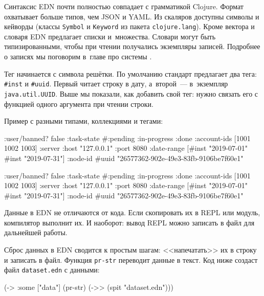 Синтаксис EDN почти полностью совпадает с грамматикой Clojure. Формат охватывает
больше типов, чем JSON и YAML. Из скаляров доступны символы и кейворды (классы
\verb|Symbol| и \verb|Keyword| из пакета \verb|clojure.lang|). Кроме вектора и
словаря EDN предлагает списки и~множества. Словари могут быть типизированными,
чтобы при чтении получались экземпляры записей. Подробнее о записях мы поговорим
в~главе про системы .


Тег начинается с символа решётки. По умолчанию стандарт предлагает два тега:
\verb|#inst| и \verb|#uuid|. Первый читает строку в дату, а~второй~---
в~экземпляр \verb|java.util.UUID|. Выше мы показали, как добавить свой тег:
нужно связать его с функцией одного аргумента при чтении строки.

Пример с разными типами, коллекциями и тегами:

\ifnarrow

\begin{english}
  \begin{clojure}
{:user/banned? false
 :task-state
 #{:pending :in-progress :done}
 :account-ids
 [1001 1002 1003]
 :server
 {:host "127.0.0.1" :port 8080}
 :date-range
 [#inst "2019-07-01" #inst "2019-07-31"]
 :node-id #uuid
 "26577362-902e-49e3-83fb-9106be7f60e1"}
  \end{clojure}
\end{english}

\else

\begin{english}
  \begin{clojure}
{:user/banned? false
 :task-state #{:pending :in-progress :done}
 :account-ids [1001 1002 1003]
 :server {:host "127.0.0.1" :port 8080}
 :date-range [#inst "2019-07-01" #inst "2019-07-31"]
 :node-id #uuid "26577362-902e-49e3-83fb-9106be7f60e1"}
  \end{clojure}
\end{english}

\fi

Данные в EDN не отличаются от кода. Если скопировать их в REPL или модуль,
компилятор выполнит их. И наоборот: вывод REPL можно записать в файл для
дальнейшей работы.

Сброс данных в EDN сводится к простым шагам: <<напечатать>> их в строку и
записать в файл. Функция \verb|pr-str| переводит данные в текст. Код ниже
создаст файл \verb|dataset.edn| с данными:

\begin{english}
  \begin{clojure}
(-> {:some ["data"]}
    (pr-str)
    (->> (spit "dataset.edn")))
  \end{clojure}
\end{english}

